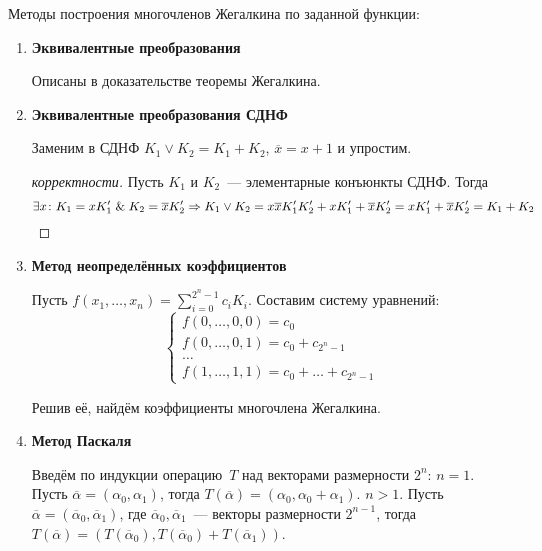 Методы построения многочленов Жегалкина по заданной функции:
\begin{enumerate}
	\item \textbf{Эквивалентные преобразования}
	
	Описаны в доказательстве теоремы Жегалкина.
	
	\item \textbf{Эквивалентные преобразования СДНФ}
	
	Заменим в СДНФ $K_1 \lor K_2 = K_1 + K_2$, $\overline x = x + 1$ и упростим.
	\begin{proof}[корректности]
	Пусть $K_1$ и $K_2$~--- элементарные конъюнкты СДНФ.
	Тогда
	\begin{equation*}
	\exists x \colon K_1 = x K_1' \mathrel{\&} K_2 = \overline x K_2' \Rightarrow
	K_1 \lor K_2 =
	x \overline x K_1' K_2' + x K_1' + \overline x K_2' =
	x K_1' + \overline x K_2' =
	K_1 + K_2
	\end{equation*}
	\end{proof}
	
	\item {} \textbf{Метод неопределённых коэффициентов}
	
	Пусть $\displaystyle  f(x_1, \ldots, x_n) = \sum_{i=0}^{2^n-1} c_i K_i$.
	Составим систему уравнений:
	\begin{equation*}
	\begin{cases}
	f(0, \ldots, 0, 0) = c_0 \\
	f(0, \ldots, 0, 1) = c_0 + c_{2^n-1} \\
	\ldots \\
	f(1, \ldots, 1, 1) = c_0 + \ldots + c_{2^n-1}
	\end{cases}
	\end{equation*}
	
	Решив её, найдём коэффициенты многочлена Жегалкина.
	
	\item {} \textbf{Метод Паскаля}
	
	Введём по индукции операцию~$T$ над векторами размерности $2^n$:
		\indbase $n = 1$.
		Пусть $\overline\alpha = (\alpha_0, \alpha_1)$, тогда $T(\overline\alpha) = (\alpha_0, \alpha_0 + \alpha_1)$.
		\indstep $n > 1$.
		Пусть $\overline\alpha = (\overline\alpha_0, \overline\alpha_1)$, где
		$\overline\alpha_0, \overline\alpha_1$~--- векторы размерности $2^{n-1}$, тогда
		$T(\overline\alpha) = (T(\overline\alpha_0), T(\overline\alpha_0) + T(\overline\alpha_1))$.
		\indend
		

\end{enumerate}
